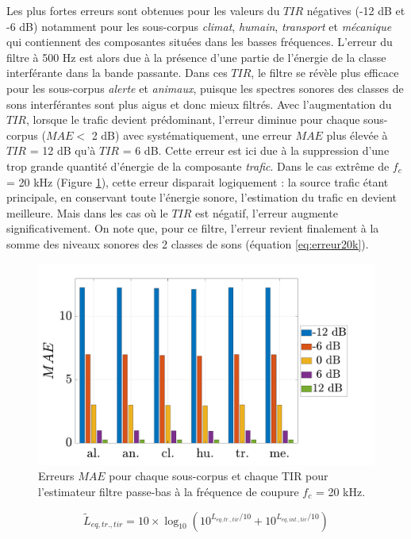 Les plus fortes erreurs sont obtenues pour les valeurs du $TIR$ négatives (-12 dB et -6 dB) notamment pour les sous-corpus \textit{climat}, \textit{humain}, \textit{transport} et \textit{mécanique} qui contiennent des composantes situées dans les basses fréquences. L'erreur du filtre à 500 Hz est alors due à la présence d'une partie de l'énergie de la classe interférante dans la bande passante. Dans ces $TIR$, le filtre se révèle plus efficace pour les sous-corpus \textit{alerte} et \textit{animaux}, puisque les spectres sonores des classes de sons interférantes sont plus aigus et donc mieux filtrés.
Avec l'augmentation du $TIR$, lorsque le trafic devient prédominant, l'erreur diminue pour chaque sous-corpus ($MAE <$ 2 dB) avec systématiquement, une erreur $MAE$ plus élevée à $TIR$ = 12 dB qu'à $TIR$ = 6 dB. Cette erreur est ici due à la suppression d'une trop grande quantité d'énergie de la composante \textit{trafic}. Dans le cas extrême de $f_c$ = 20 kHz (Figure \ref{fig:filtre_amb_tir_20k}), cette erreur disparait logiquement : la source trafic étant principale, en conservant toute l'énergie sonore, l'estimation du trafic en devient meilleure. Mais dans les cas où le $TIR$ est négatif, l'erreur augmente significativement. On note que, pour ce filtre, l'erreur revient finalement à la somme des niveaux sonores des 2 classes de sons (équation \ref{eq:erreur20k}).

\begin{figure}[h!]
\centering
\includegraphics[width=0.7\linewidth]{./figures/resultats/amb_filtre_20k_bar.pdf}
\caption{Erreurs $MAE$ pour chaque sous-corpus et chaque TIR pour l'estimateur filtre passe-bas à la fréquence de coupure $f_c$ = 20 kHz.}
\label{fig:filtre_amb_tir_20k}
\end{figure}

\begin{equation}\label{eq:erreur20k}
\tilde{L}_{eq,tr.,tir} = 10\times \log_{10}\left(10^{L_{eq,tr.,tir}/10}+10^{L_{eq,int.,tir}/10}\right)
\end{equation}


